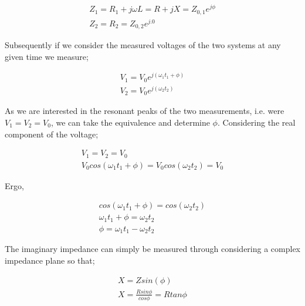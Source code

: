 \begin{align}
Z_{1} = R_{1} + j\omega L = R + jX = Z_{0,1}e^{j\phi} \\
Z_{2} = R_{2} = Z_{0,2}e^{j.0}
\end{align}

Subsequently if we consider the measured voltages of the two systems at any given time we measure;

\begin{align}
V_{1} = V_{0}e^{j(\omega_{1} t_{1} + \phi)} \\
V_{2} = V_{0}e^{j(\omega_{2} t_{2})}
\end{align}

As we are interested in the resonant peaks of the two measurements, i.e. were $V_{1} = V_{2} = V_{0}$, we can take the equivalence and determine $\phi$. Considering the real component of the voltage;

\begin{align}
V_{1} = V_{2} = V_{0} \\
V_{0}cos\left( \omega_{1}t_{1} + \phi\right) = V_{0}cos\left( \omega_{2}t_{2}\right) = V_{0}
\end{align}

Ergo,

\begin{align}
cos\left( \omega_{1}t_{1} + \phi\right) = cos\left( \omega_{2}t_{2}\right) \\
\omega_{1}t_{1} + \phi =  \omega_{2}t_{2} \\
\phi =  \omega_{1}t_{1} -  \omega_{2}t_{2}
\end{align}

The imaginary impedance can simply be measured through considering a complex impedance plane so that;

\begin{align}
X = Zsin(\phi) \\
X = \frac{Rsin{\phi}}{cos\phi} = Rtan\phi
\end{align} 
